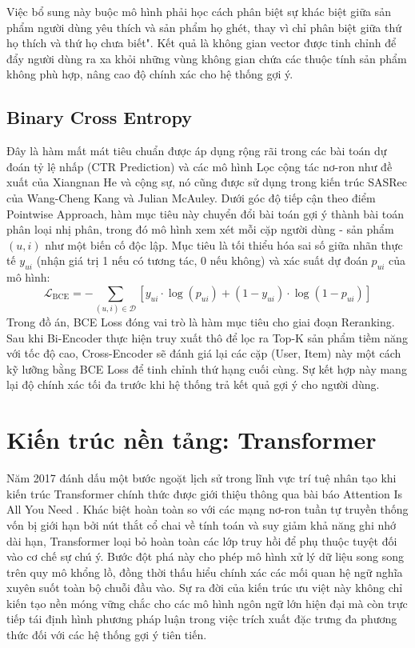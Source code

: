 Việc bổ sung này buộc mô hình phải học cách phân biệt sự khác biệt giữa sản phẩm người dùng yêu thích và sản phẩm họ ghét, thay vì chỉ phân biệt giữa thứ họ thích và thứ họ chưa biết". Kết quả là không gian vector được tinh chỉnh để đẩy người dùng ra xa khỏi những vùng không gian chứa các thuộc tính sản phẩm không phù hợp, nâng cao độ chính xác cho hệ thống gợi ý.

\subsection{Binary Cross Entropy}
Đây là hàm mất mát tiêu chuẩn được áp dụng rộng rãi trong các bài toán dự đoán tỷ lệ nhấp (CTR Prediction) và các mô hình Lọc cộng tác nơ-ron như đề xuất của Xiangnan He và cộng sự\cite{22}, nó cũng được sử dụng trong kiến trúc SASRec của Wang-Cheng Kang và Julian McAuley\cite{7}. Dưới góc độ tiếp cận theo điểm Pointwise Approach, hàm mục tiêu này chuyển đổi bài toán gợi ý thành bài toán phân loại nhị phân, trong đó mô hình xem xét mỗi cặp người dùng - sản phẩm $(u, i)$ như một biến cố độc lập. Mục tiêu là tối thiểu hóa sai số giữa nhãn thực tế $y_{ui}$ (nhận giá trị 1 nếu có tương tác, 0 nếu không) và xác suất dự đoán $p_{ui}$ của mô hình:
\begin{equation}
    \mathcal{L}_{\text{BCE}} = - \sum_{(u,i) \in \mathcal{D}} \left[ y_{ui} \cdot \log(p_{ui}) + (1 - y_{ui}) \cdot \log(1 - p_{ui}) \right]
\end{equation}
Trong đồ án, BCE Loss đóng vai trò là hàm mục tiêu cho giai đoạn Reranking. Sau khi Bi-Encoder thực hiện truy xuất thô để lọc ra Top-K sản phẩm tiềm năng với tốc độ cao, Cross-Encoder sẽ đánh giá lại các cặp (User, Item) này một cách kỹ lưỡng bằng BCE Loss để tinh chỉnh thứ hạng cuối cùng. Sự kết hợp này mang lại độ chính xác tối đa trước khi hệ thống trả kết quả gợi ý cho người dùng.

\section{Kiến trúc nền tảng: Transformer}

Năm 2017 đánh dấu một bước ngoặt lịch sử trong lĩnh vực trí tuệ nhân tạo khi kiến trúc Transformer chính thức được giới thiệu thông qua bài báo Attention Is All You Need \cite{12}. Khác biệt hoàn toàn so với các mạng nơ-ron tuần tự truyền thống vốn bị giới hạn bởi nút thắt cổ chai về tính toán và suy giảm khả năng ghi nhớ dài hạn, Transformer loại bỏ hoàn toàn các lớp truy hồi để phụ thuộc tuyệt đối vào cơ chế sự chú ý. Bước đột phá này cho phép mô hình xử lý dữ liệu song song trên quy mô khổng lồ, đồng thời thấu hiểu chính xác các mối quan hệ ngữ nghĩa xuyên suốt toàn bộ chuỗi đầu vào. Sự ra đời của kiến trúc ưu việt này không chỉ kiến tạo nền móng vững chắc cho các mô hình ngôn ngữ lớn hiện đại mà còn trực tiếp tái định hình phương pháp luận trong việc trích xuất đặc trưng đa phương thức đối với các hệ thống gợi ý tiên tiến.

